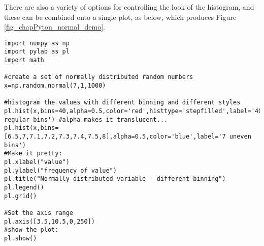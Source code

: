 There are also a variety of options for controlling the look of the histogram, and these can be combined onto a single plot, as below, which produces Figure \ref{fig_chapPyton_normal_demo}.
\begin{lstlisting}[frame=single] 
import numpy as np
import pylab as pl
import math 

#create a set of normally distributed random numbers
x=np.random.normal(7,1,1000)

#histogram the values with different binning and different styles
pl.hist(x,bins=40,alpha=0.5,color='red',histtype='stepfilled',label='40 regular bins') #alpha makes it translucent...
pl.hist(x,bins=[6.5,7,7.1,7.2,7.3,7.4,7.5,8],alpha=0.5,color='blue',label='7 uneven bins')
#Make it pretty:
pl.xlabel("value")
pl.ylabel("frequency of value")
pl.title("Normally distributed variable - different binning")
pl.legend()
pl.grid()

#Set the axis range
pl.axis([3.5,10.5,0,250])
#show the plot:
pl.show()
\end{lstlisting}

